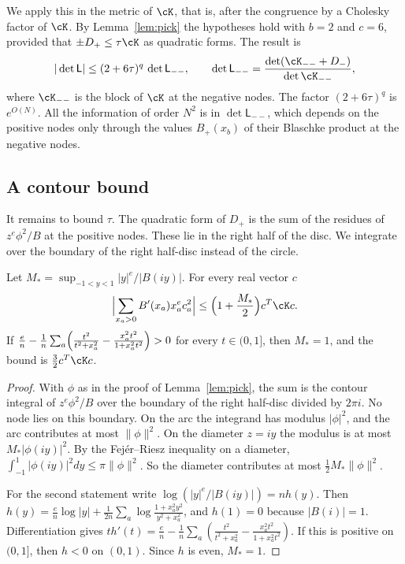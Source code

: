 We apply this in the metric of $\cK$, that is, after the congruence by a Cholesky factor of $\cK$. By
Lemma~\ref{lem:pick} the hypotheses hold with $b=2$ and $c=6$, provided that $\pm D_+\le\tau\cK$ as quadratic
forms. The result is
\begin{equation}\label{eq:C3}
 |\det\mathsf L|\le(2+6\tau)^q\,\det\mathsf L_{--},\qquad
 \det\mathsf L_{--}=\frac{\det(\cK_{--}+D_-)}{\det\cK_{--}},
\end{equation}
where $\cK_{--}$ is the block of $\cK$ at the negative nodes. The factor $(2+6\tau)^q$ is $e^{O(N)}$. All the
information of order $N^2$ is in $\det\mathsf L_{--}$, which depends on the positive nodes only through the
values $B_+(x_b)$ of their Blaschke product at the negative nodes.

\subsection{A contour bound}\label{ssec:T}
It remains to bound $\tau$. The quadratic form of $D_+$ is the sum of the residues of $z^e\phi^2/B$ at the
positive nodes. These lie in the right half of the disc. We integrate over the boundary of the right
half-disc instead of the circle.

\begin{lemma}\label{lem:T}
Let $M_*=\sup_{-1<y<1}|y|^e/|B(iy)|$. For every real vector $c$
\[
 \Bigl|\sum_{x_a>0}B'(x_a)x_a^ec_a^2\Bigr|\le\Bigl(1+\frac{M_*}2\Bigr)c^T\cK c .
\]
If $\frac en-\frac1n\sum_a\Bigl(\frac{t^2}{t^2+x_a^2}-\frac{x_a^2t^2}{1+x_a^2t^2}\Bigr)>0$ for every
$t\in(0,1]$, then $M_*=1$, and the bound is $\frac32c^T\cK c$.
\end{lemma}

\begin{proof}
With $\phi$ as in the proof of Lemma~\ref{lem:pick}, the sum is the contour integral of $z^e\phi^2/B$ over the
boundary of the right half-disc divided by $2\pi i$. No node lies on this boundary. On the arc the integrand
has modulus $|\phi|^2$, and the arc contributes at most $\|\phi\|^2$. On the diameter $z=iy$ the modulus is at
most $M_*|\phi(iy)|^2$. By the Fej\'er--Riesz inequality on a diameter, $\int_{-1}^1|\phi(iy)|^2dy\le\pi
\|\phi\|^2$. So the diameter contributes at most $\frac12M_*\|\phi\|^2$.

For the second statement write $\log(|y|^e/|B(iy)|)=nh(y)$. Then
$h(y)=\frac en\log|y|+\frac1{2n}\sum_a\log\frac{1+x_a^2y^2}{y^2+x_a^2}$, and $h(1)=0$ because $|B(i)|=1$.
Differentiation gives $th'(t)=\frac en-\frac1n\sum_a(\frac{t^2}{t^2+x_a^2}-\frac{x_a^2t^2}{1+x_a^2t^2})$. If
this is positive on $(0,1]$, then $h<0$ on $(0,1)$. Since $h$ is even, $M_*=1$.
\end{proof}

